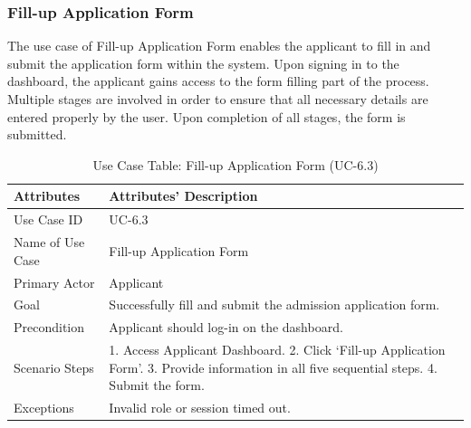 \subsubsection{Fill-up Application Form}
The use case of Fill-up Application Form enables the applicant to fill in and submit the application form within the system. Upon signing in to the dashboard, the applicant gains access to the form filling part of the process. Multiple stages are involved in order to ensure that all necessary details are entered properly by the user. Upon completion of all stages, the form is submitted.
\begin{table}[H]
    \centering
    \small
    \renewcommand{\arraystretch}{1.4}
    \caption{Use Case Table: Fill-up Application Form (UC-6.3)}
    \label{tab:fill_up_application_form}
    
    \begin{tabularx}{\textwidth}{|l|X|}
        \hline
        \rowcolor[gray]{0.9} {Attributes} & {Attributes' Description} \\ \hline
        Use Case ID & UC-6.3 \\ \hline
        Name of Use Case & Fill-up Application Form \\ \hline
        Primary Actor & Applicant \\ \hline
        Goal & Successfully fill and submit the admission application form. \\ \hline
        Precondition & Applicant should log-in on the dashboard. \\ \hline
        Scenario Steps & 1. Access Applicant Dashboard. 2. Click ‘Fill-up Application Form’. 3. Provide information in all five sequential steps. 4. Submit the form. \\ \hline
        Exceptions & Invalid role or session timed out. \\ \hline
    \end{tabularx}
\end{table}
\FloatBarrier